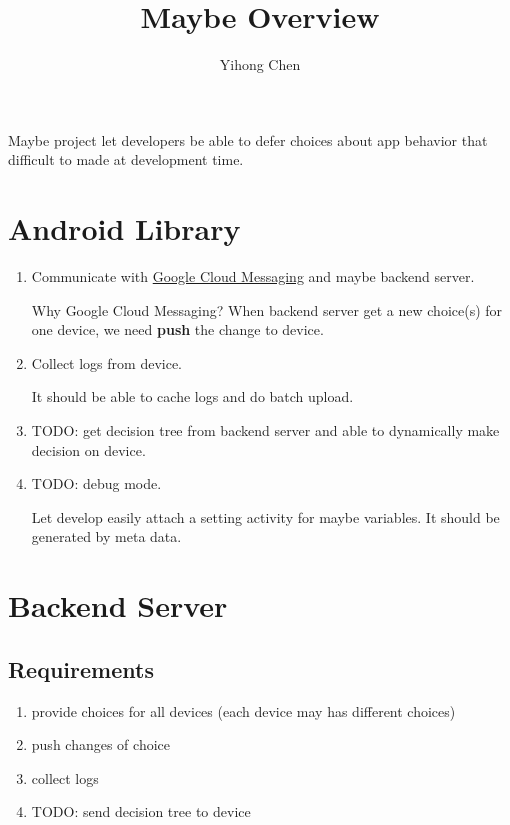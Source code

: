 \documentclass{article}
\title{Maybe Overview}
\author{Yihong Chen}
\date{}
\begin{document}
\maketitle

Maybe project let developers be able to defer choices about app behavior that difficult to made at development time.
\section{Android Library}
\label{sec:android-library}
\begin{enumerate}[label=\alph*.]
\item Communicate with \href{https://developer.android.com/google/gcm/index.html}{Google Cloud Messaging} and maybe backend server.

Why Google Cloud Messaging? When backend server get a new choice(s) for one device, we need \textbf{push} the change to device.
\item Collect logs from device.

It should be able to cache logs and do batch upload.
\item TODO: get decision tree from backend server and able to dynamically make decision on device.

\item TODO: debug mode.

Let develop easily attach a setting activity for maybe variables. It should be generated by meta data.
\end{enumerate}

\section{Backend Server}
\label{sec:backend-server}

\subsection{Requirements}
\label{sec:requirements}

\begin{enumerate}[label=\alph*.]
\item provide choices for all devices (each device may has different choices)
\item push changes of choice
\item collect logs
\item TODO: send decision tree to device
\end{enumerate}
\end{document}
